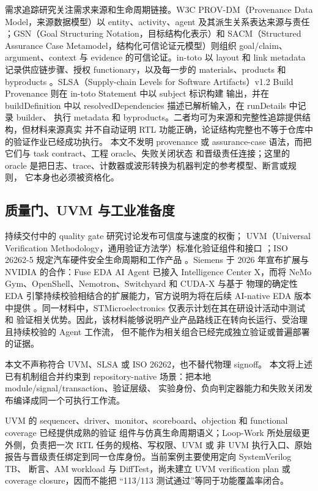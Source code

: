 \documentclass[UTF8,a4paper,zihao=-4,oneside]{ctexart}
\begin{document}
需求追踪研究关注需求来源和生命周期链接\cite{gotel1994traceability}。W3C PROV-DM（Provenance
Data Model，来源数据模型）以 entity、activity、agent 及其派生关系表达来源与责任
\cite{w3c2013provdm}；GSN（Goal Structuring Notation，目标结构化表示）和 SACM（Structured
Assurance Case Metamodel，结构化可信论证元模型）则组织 goal/claim、
argument、context 与 evidence 的可信论证\cite{scsc2021gsn,omg2023sacm}。in-toto 以 layout 和 link
metadata 记录供应链步骤、授权 functionary，以及每一步的 materials、products 和 byproducts
\cite{torresarias2019intoto}。SLSA（Supply-chain Levels for Software Artifacts）v1.2 Build Provenance
则在 in-toto Statement 中以 subject 标识构建
输出，并在 buildDefinition 中以 resolvedDependencies 描述已解析输入，在 runDetails 中记录 builder、
执行 metadata 和 byproducts\cite{slsa2025v12}。二者均可为来源和完整性追踪提供结构，但材料来源真实
并不自动证明 RTL 功能正确，论证结构完整也不等于仓库中的验证作业已经成功执行。
本文不发明 provenance 或 assurance-case 语法，而把它们与 task contract、工程 oracle、失败关闭状态
和晋级责任连接；这里的 oracle 是把日志、trace、计数器或波形转换为机器判定的参考模型、断言或规则，
它本身也必须被资格化。

\subsection{质量门、UVM 与工业准备度}

持续交付中的 quality gate 研究讨论发布可信度与速度的权衡\cite{schermann2016qualitygates}；
UVM（Universal Verification Methodology，通用验证方法学）标准化验证组件和接口
\cite{ieeeiec2023uvm}；ISO 26262-5 规定汽车硬件安全生命周期和工作产品
\cite{iso2018functionalhardware}。Siemens 于 2026 年宣布扩展与 NVIDIA 的合作：Fuse EDA AI Agent
已接入 Intelligence Center X，而将 NeMo Gym、OpenShell、Nemotron、Switchyard 和 CUDA-X 与基于
物理的确定性 EDA 引擎持续校验相结合的扩展能力，官方说明为将在后续 AI-native EDA 版本中提供
\cite{siemens2026selfverifying}。同一材料中，STMicroelectronics 仅表示计划在其在研设计活动中测试和
验证相关优势。因此，该材料能够说明产业产品路线正在转向长运行、受治理且持续校验的 Agent 工作流，
但不能作为相关组合已经完成独立验证或普遍部署的证据。

本文不声称符合 UVM、SLSA 或 ISO 26262，也不替代物理 signoff。
本文将上述已有机制组合并约束到 repository-native 场景：把本地 module/signal/transaction、验证层级、
实验身份、负向判定器能力和失败关闭发布编译成同一个可执行工作流。

UVM 的 sequencer、driver、monitor、scoreboard、objection 和 functional coverage 已经提供成熟的验证
组件与仿真生命周期语义；Loop-Work 所处层级更外侧，负责把一次 RTL 任务的规格、写权限、UVM 或
非 UVM 执行入口、原始报告与晋级责任绑定到同一仓库身份。当前案例主要使用定向 SystemVerilog TB、
断言、AM workload 与 DiffTest，尚未建立 UVM verification plan 或 coverage closure，因而不能把
“113/113 测试通过”等同于功能覆盖率闭合。
\end{document}
